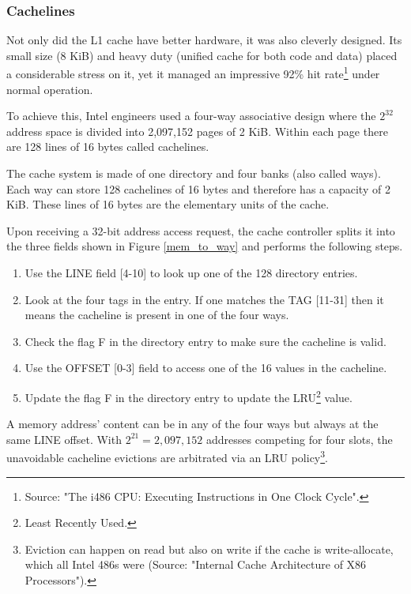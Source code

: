 \subsubsection{Cachelines}
Not only did the L1 cache have better hardware, it was also cleverly designed. Its small size (8 KiB) and heavy duty (unified cache for both code and data) placed a considerable stress on it, yet it managed an impressive 92\% hit rate\footnote{Source: "The i486 CPU: Executing Instructions in One Clock Cycle".} under normal operation.\\
\par
To achieve this, Intel engineers used a four-way associative design where the $2^{32}$ address space is divided into 2,097,152 pages of 2 KiB. Within each page there are 128 lines of 16 bytes called cachelines.\\
\par
{}
\par
The cache system is made of one directory and four banks (also called ways). Each way can store 128 cachelines of 16 bytes and therefore has a capacity of 2 KiB. These lines of 16 bytes are the elementary units of the cache.\\
\par
Upon receiving a 32-bit address access request, the cache controller splits it into the three fields shown in Figure \ref{mem_to_way} and performs the following steps.
\begin{enumerate}
\item Use the LINE field [4-10] to look up one of the 128 directory entries.
\item Look at the four tags in the entry. If one matches the TAG [11-31] then it means the cacheline is present in one of the four ways.
\item Check the flag F in the directory entry to make sure the cacheline is valid.
\item Use the OFFSET [0-3] field to access one of the 16 values in the cacheline.
\item Update the flag F in the directory entry to update the LRU\footnote{Least Recently Used.}  value.
\end{enumerate}
\par
A memory address' content can be in any of the four ways but always at the same LINE offset. With $2^{21} = 2,097,152$ addresses competing for four slots, the unavoidable cacheline evictions are arbitrated via an LRU policy\footnote{Eviction can happen on read but also on write if the cache is write-allocate, which all Intel 486s were (Source: "Internal Cache Architecture of X86 Processors").}.\\
